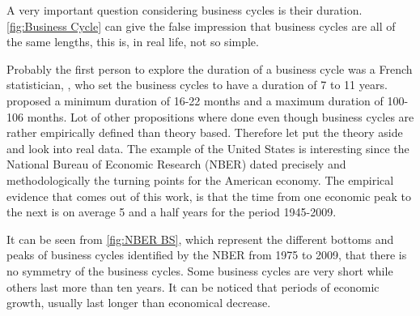 \documentclass[12pt,a4paper,oneside]{book}
\begin{document}
A very important question considering business cycles is their duration.
\autoref{fig:Business Cycle} can give the false impression that business cycles are all of the same lengths, this is, in real life, not so simple.

Probably the first person to explore the duration of a business cycle was a French statistician, \cite{juglar_crises_1862}, who set the business cycles to have a duration of 7 to 11 years.
\cite{mitchell_measuring_1946} proposed a minimum duration of 16-22 months and a maximum duration of 100-106 months.
Lot of other propositions where done even though business cycles are rather empirically defined than theory based.
Therefore let put the theory aside and look into real data.
The example of the United States is interesting since the National Bureau of Economic Research (NBER) dated precisely and methodologically the turning points for the American economy. The empirical evidence that comes out of this work, is that the time from one economic peak to the next is on average 5 and a half years for the period 1945-2009.

It can be seen from \autoref{fig:NBER BS}, which represent the different bottoms and peaks of business cycles identified by the NBER from 1975 to 2009, that there is no symmetry of the business cycles. Some business cycles are very short while others last more than ten years.
It can be noticed that periods of economic growth, usually last longer than economical decrease.
\end{document}
